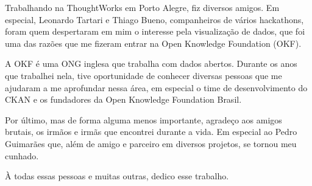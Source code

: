 Trabalhando na ThoughtWorks em Porto Alegre, fiz diversos amigos. Em especial,
Leonardo Tartari e Thiago Bueno, companheiros de vários hackathons, foram quem
despertaram em mim o interesse pela visualização de dados, que foi uma das
razões que me fizeram entrar na Open Knowledge Foundation (OKF).

A OKF é uma ONG inglesa que trabalha com dados abertos. Durante os anos que
trabalhei nela, tive oportunidade de conhecer diversas pessoas que me ajudaram
a me aprofundar nessa área, em especial o time de desenvolvimento do CKAN e os
fundadores da Open Knowledge Foundation Brasil.

Por último, mas de forma alguma menos importante, agradeço aos amigos brutais,
os irmãos e irmãs que encontrei durante a vida. Em especial ao Pedro Guimarães
que, além de amigo e parceiro em diversos projetos, se tornou meu cunhado.

À todas essas pessoas e muitas outras, dedico esse trabalho.
